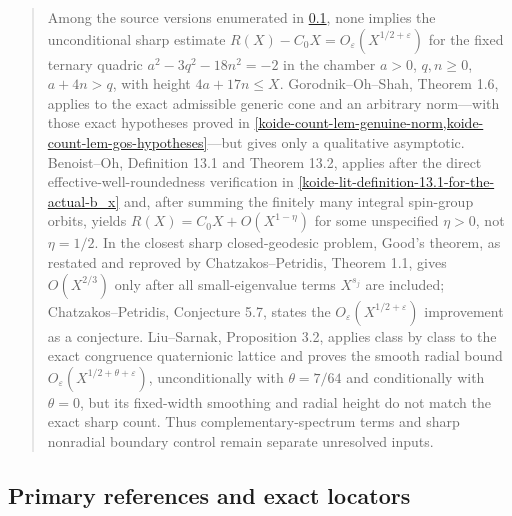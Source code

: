 \begin{quote}
Among the source versions enumerated in \cref{koide-lit-primary-references-and-exact-locators}, none implies the unconditional sharp estimate \(R(X)-C_0X=O_\varepsilon(X^{1/2+\varepsilon})\) for the fixed ternary quadric \(a^2-3q^2-18n^2=-2\) in the chamber \(a>0\), \(q,n\geq0\), \(a+4n>q\), with height \(4a+17n\leq X\). Gorodnik--Oh--Shah, Theorem 1.6, applies to the exact admissible generic cone and an arbitrary norm---with those exact hypotheses proved in \cref{koide-count-lem-genuine-norm,koide-count-lem-gos-hypotheses}---but gives only a qualitative asymptotic. Benoist--Oh, Definition 13.1 and Theorem 13.2, applies after the direct effective-well-roundedness verification in \cref{koide-lit-definition-13.1-for-the-actual-b_x} and, after summing the finitely many integral spin-group orbits, yields \(R(X)=C_0X+O(X^{1-\eta})\) for some unspecified \(\eta>0\), not \(\eta=1/2\). In the closest sharp closed-geodesic problem, Good's theorem, as restated and reproved by Chatzakos--Petridis, Theorem 1.1, gives \(O(X^{2/3})\) only after all small-eigenvalue terms \(X^{s_j}\) are included; Chatzakos--Petridis, Conjecture 5.7, states the \(O_\varepsilon(X^{1/2+\varepsilon})\) improvement as a conjecture. Liu--Sarnak, Proposition 3.2, applies class by class to the exact congruence quaternionic lattice and proves the smooth radial bound \(O_\varepsilon(X^{1/2+\theta+\varepsilon})\), unconditionally with \(\theta=7/64\) and conditionally with \(\theta=0\), but its fixed-width smoothing and radial height do not match the exact sharp count. Thus complementary-spectrum terms and sharp nonradial boundary control remain separate unresolved inputs.
\end{quote}

\subsection{Primary references and exact locators}\label{koide-lit-primary-references-and-exact-locators}


